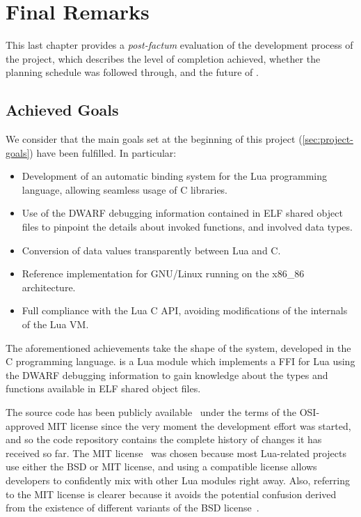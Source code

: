 \cleardoublepage
\setchaptertoc
\chapter{Final Remarks}

This last chapter provides a \emph{post-factum} evaluation of the development
process of the project, which describes the level of completion achieved,
whether the planning schedule was followed through, and the future of \Eol*.
\afterintro

\section{Achieved Goals}

We consider that the main goals set at the beginning of this project
(\autoref{sec:project-goals}) have been fulfilled. In particular:

\begin{itemize}

	\item Development of an automatic binding system for the Lua programming
	language, allowing seamless usage of C libraries.

	\item Use of the DWARF debugging information contained in ELF shared object
	files to pinpoint the details about invoked functions, and involved data
	types.

	\item Conversion of data values transparently between Lua and C.

	\item Reference implementation for GNU/Linux running on the
	x86\_86 architecture.

	\item Full compliance with the Lua C API, avoiding modifications of the
		internals of the Lua VM.

\end{itemize}

The aforementioned achievements take the shape of the \Eol* system, developed
in the C programming language. \Eol* is a Lua module which implements a FFI
for Lua using the DWARF debugging information to gain knowledge about the
types and functions available in ELF shared object files.

The source code has been publicly available~\cite{eol-github} under the terms
of the \gls{OSI}-approved MIT license since the very moment the development
effort was started, and so the code repository contains the complete history
of changes it has received so far. The MIT license~\cite{mit-license} was chosen because most
Lua-related projects use either the BSD or MIT license, and using a compatible
license allows developers to confidently mix \Eol* with other Lua modules
right away. Also, referring to the MIT license is clearer because it avoids
the potential confusion derived from the existence of different variants of
the BSD license~\cite{bsd-licenses}.

